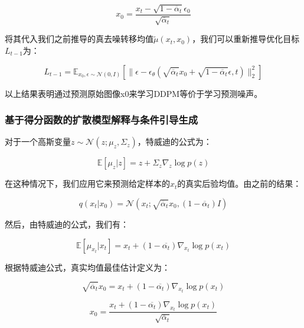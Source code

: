 \begin{equation}\label{eqn-22}
      x_0 = \frac{x_t - \sqrt{1-\overline{\alpha}_t}\epsilon_0}{\sqrt{\overline{\alpha}_t}}
\end{equation}

将其代入我们之前推导的真去噪转移均值$\widetilde{\mu}(x_t,x_0)$，我们可以重新推导优化目标$L_{t-1}$为：

\begin{equation}\label{eqn-23}
      L_{t-1}=\mathbb{E}_{x_0,\epsilon \sim \mathcal{N}(0,I)}[\lVert \epsilon - \epsilon_\theta (\sqrt{\overline{\alpha}_t}x_0 + \sqrt{1 - \overline{\alpha}_t}\epsilon,t)\rVert^2_2]
\end{equation}

以上结果表明通过预测原始图像x0来学习DDPM等价于学习预测噪声。

\subsubsection{基于得分函数的扩散模型解释与条件引导生成}

对于一个高斯变量$z\sim \mathcal{N} ( z ; \mu_z , \Sigma_z)$，特威迪的公式为：

\begin{equation}\label{eqn-24}
\mathbb{E}[\mu_z | z] = z + \Sigma_z\nabla_z\log{p(z)}
\end{equation}

在这种情况下，我们应用它来预测给定样本的$x_t$的真实后验均值。由之前的结果：

\begin{equation}\label{eqn-25}
      q(x_t|x_0) = \mathcal{N}(x_t;\sqrt{\overline{\alpha}_t}x_0,(1-\overline{\alpha}_t)I)
\end{equation}

然后，由特威迪的公式，我们有：

\begin{equation}\label{eqn-26}
  \mathbb{E}[\mu_{x_t} | x_t] = x_t + (1-\overline{\alpha_t})\nabla_{x_t}\log{p(x_t)}
\end{equation}

根据特威迪公式，真实均值最佳估计定义为：

\begin{equation}\label{eqn-27}
  \sqrt{\overline{\alpha}_t}x_0 = x_t + (1-\overline{\alpha_t})\nabla_{x_t}\log{p(x_t)}
\end{equation}

\begin{equation}\label{eqn-28}
  x_0 =\frac{ x_t + (1-\overline{\alpha_t})\nabla_{x_t}\log{p(x_t)}}{\sqrt{\overline{\alpha}_t}}
\end{equation}

